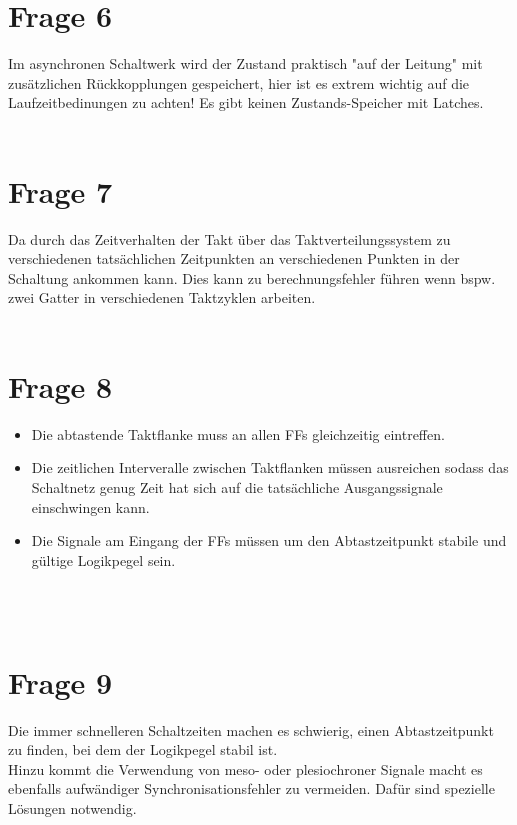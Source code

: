 \documentclass[a4paper]{scrartcl}
\newcounter{punkte}
\begin{document}
\section*{Frage 6}
Im asynchronen Schaltwerk wird der Zustand praktisch "auf der Leitung" mit zusätzlichen Rückkopplungen gespeichert, hier ist es extrem wichtig auf die Laufzeitbedinungen zu achten! Es gibt keinen Zustands-Speicher mit Latches.
~\\
~\\
\section*{Frage 7}
Da durch das Zeitverhalten der Takt über das Taktverteilungssystem zu verschiedenen tatsächlichen Zeitpunkten an verschiedenen Punkten in der Schaltung ankommen kann. Dies kann zu berechnungsfehler führen wenn bspw. zwei Gatter in verschiedenen Taktzyklen arbeiten.
~\\
~\\
\section*{Frage 8}
\begin{itemize}
	\item Die abtastende Taktflanke muss an allen FFs gleichzeitig eintreffen.
	\item Die zeitlichen Interveralle zwischen Taktflanken müssen ausreichen sodass das Schaltnetz genug Zeit hat sich auf die tatsächliche Ausgangssignale einschwingen kann.
	\item Die Signale am Eingang der FFs müssen um den Abtastzeitpunkt stabile und gültige Logikpegel sein.
\end{itemize}
~\\
~\\
\section*{Frage 9}
Die immer schnelleren Schaltzeiten machen es schwierig, einen Abtastzeitpunkt zu finden, bei dem der Logikpegel stabil ist.\\
Hinzu kommt die Verwendung von meso- oder plesiochroner Signale macht es ebenfalls aufwändiger Synchronisationsfehler zu vermeiden. Dafür sind spezielle Lösungen notwendig.

~\\
~\\
\end{document}
